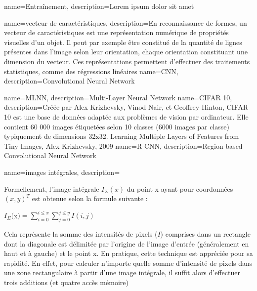 \makeglossaries

{
  name={Entraînement},
	description={Lorem ipsum dolor sit amet}
}

{
  name={vecteur de caractéristiques},
	description={En reconnaissance de formes, un vecteur de caractéristiques est une représentation numérique de
	propriétés visuelles d'un objet. Il peut par exemple être constitué de la quantité de lignes présentes dans
	l'image selon leur orientation, chaque orientation constituant une dimension du vecteur. Ces représentations
	permettent d'effectuer des traitements statistiques, comme des régressions linéaires}
}
{
  name={CNN},
	description={Convolutional Neural Network}
}

{
  name={MLNN},
	description={Multi-Layer Neural Network}
}
{
  name={CIFAR 10},
	description={Créée par Alex Krizhevsky, Vinod Nair, et Geoffrey Hinton, CIFAR 10 est une base de données adaptée aux problèmes de vision par ordinateur. Elle contient 60 000 images étiquetées selon 10 classes (6000 images par classe) typiquement de dimensions 32x32. Learning Multiple Layers of Features from Tiny Images, Alex Krizhevsky, 2009}
}
{
  name={R-CNN},
	description={Region-based Convolutional Neural Network}
}
{
  name={images intégrales},
	description={Formellement, l'image intégrale $I_{\Sigma}(x)$ du point x ayant pour coordonnées $(x,y)^{T}$ est obtenue selon la formule suivante : 
	\\
	      \begin{center}
		$I_{\Sigma}($x$) = \sum\limits_{i=0}^{i \leq x}{\sum\limits_{j=0}^{j \leq y}{I(i, j)}}$
	      \end{center}
	 \vspace{0.5cm}
         Cela représente la somme des intensités de pixels ($I$) comprises dans un rectangle dont la diagonale est délimitée par l'origine de l'image d'entrée (généralement en haut et à gauche) et le point x.
         En pratique, cette technique est appréciée pour sa rapidité. En effet, pour calculer n'importe quelle somme d'intensité de pixels dans une zone rectangulaire à partir d'une image intégrale, il suffit alors d'effectuer trois additions (et quatre accès mémoire)}
}

